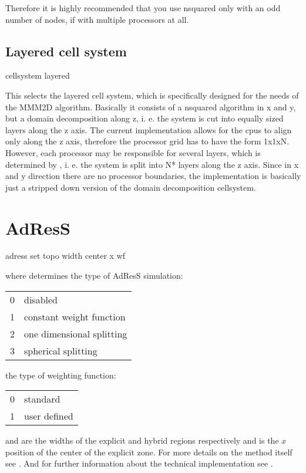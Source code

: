 Therefore it is highly recommended that you use nsquared only with an
odd number of nodes, if with multiple processors at all. 

\subsection{Layered cell system}
\begin{essyntax}
  cellsystem layered 
\end{essyntax}

This selects the layered cell system, which is specifically designed
for the needs of the MMM2D algorithm. Basically it consists of a
nsquared algorithm in x and y, but a domain decomposition along z, i.
e. the system is cut into equally sized layers along the z axis. The
current implementation allows for the cpus to align only along the z
axis, therefore the processor grid has to have the form 1x1xN.
However, each processor may be responsible for several layers, which
is determined by , i. e. the system is split into
N* layers along the z axis. Since in x and y direction
there are no processor boundaries, the implementation is basically
just a stripped down version of the domain decomposition cellsystem.

\section{AdResS}
\begin{essyntax}
adress set topo  width   center x  wf 
\begin{features}
  \end{features}
\end{essyntax}

where  determines the type of AdResS simulation:\newline
\begin{tabular}{ll}
0&disabled\\
1&constant weight function\\
2&one dimensional splitting\\
3&spherical splitting
\end{tabular}\newline
{} the type of weighting function:\newline
\begin{tabular}{ll}
0&standard\\
1&user defined
\end{tabular}\newline
{} and  are the widths of the explicit and hybrid regions respectively and  is the $x$ position of the center of the explicit zone.
For more details on the method itself see \cite{praprotnik05,praprotnik08,poblete10}.
And for further information about the technical implementation see \cite{junghans10}.

